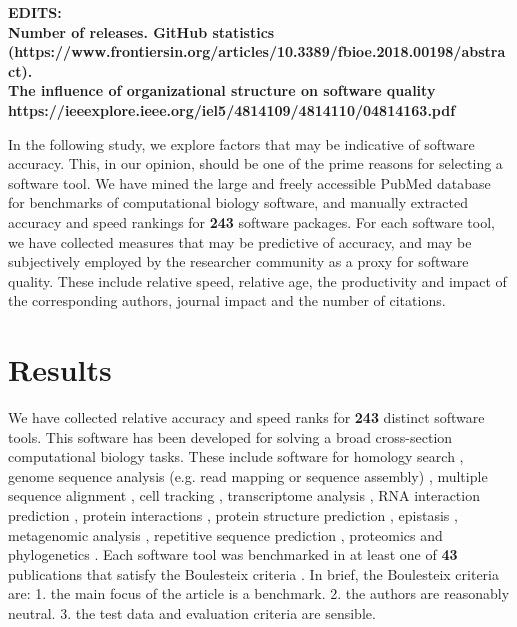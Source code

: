 \documentclass[fleqn,10pt]{SelfArx} %
\begin{document}
{\bf EDITS:\\
  Number of releases. GitHub statistics (https://www.frontiersin.org/articles/10.3389/fbioe.2018.00198/abstract).\\
  The influence of organizational structure on software quality https://ieeexplore.ieee.org/iel5/4814109/4814110/04814163.pdf
  }

In the following study, we explore factors that may be indicative of software accuracy. This, in our opinion, should be one of the prime reasons for selecting a software tool. We have mined the large and freely accessible PubMed database \cite{Sayers2010-vm} for benchmarks of computational biology software, and manually extracted accuracy and speed rankings for \textbf{{\color{black}243}} software packages. For each software tool, we have collected measures that may be predictive of accuracy, and may be subjectively employed by the researcher community as a proxy for software quality. These include relative speed, relative age, the productivity and impact of the corresponding authors, journal impact and the number of citations. 

\section*{Results}
We have collected relative accuracy and speed ranks for \textbf{{\color{black}243}} distinct software tools. This software has been developed for solving a broad cross-section computational biology tasks. These include software for homology search \cite{Freyhult2007-et}, genome sequence analysis (e.g. read mapping or sequence assembly) \cite{Junemann2014-mb,Tran2014-pe,Zhang2011-nd,Abbas2014-gu,Bao2011-lv,Caboche2014-lj,Kleftogiannis2013-wi,Hatem2013-cs,Schbath2012-ob,Ruffalo2011-rl,Yang2013-aj,Holtgrewe2011-fd,Rackham2015-ag,Huang2015-wu}, multiple sequence alignment \cite{Thompson2011-rf,Nuin2006-nk,Pais2014-sr,Pervez2014-zp,Liu2010-rp}, cell tracking \cite{Maska2014-ak}, transcriptome analysis \cite{Li2012-wr,Lu2013-fs,Liu2014-kz,Kumar2016-xz}, RNA interaction prediction \cite{Pain2015-gr}, protein interactions \cite{Tikk2010-qd}, protein structure prediction \cite{Kolodny2005-ry,Wallner2005-qi}, epistasis \cite{Shang2011-vy},  metagenomic analysis \cite{Lindgreen2016-tt,Bazinet2012-wf}, repetitive sequence prediction \cite{Saha2008-kd}, proteomics \cite{Lange2008-pt,Yang2009-oc} and phylogenetics \cite{Liu2011-pz,Yang2011-dv,Oscamou2008-md,Bayzid2013-hc,Liu2009-lx}. Each software tool was benchmarked in at least one of \textbf{{\color{black}43}} publications that satisfy the Boulesteix criteria \cite{Boulesteix2013-vb}. In brief, the Boulesteix criteria are: 1. the main focus of the article is a benchmark. 2. the authors are reasonably neutral. 3. the test data and evaluation criteria are sensible.
\end{document}
